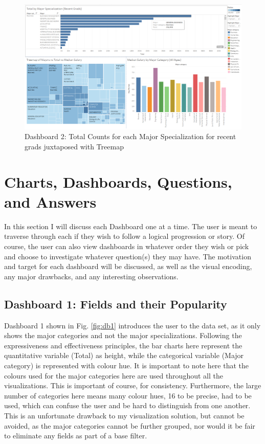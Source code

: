 \documentclass[sigchi]{acmart}
\begin{document}
  \begin{figure}[thpb]
  \includegraphics[width=1.0\textwidth]{DB2.png}
     \caption{Dashboard 2: Total Counts for each Major Specialization for recent grads juxtaposed with Treemap}
         \label{fig:db2}
  \end{figure}
  
\section{Charts, Dashboards, Questions, and Answers}

In this section I will discuss each Dashboard one at a time. The user is meant to traverse through each if they wish to follow a logical progression or story. Of course, the user can also view dashboards in whatever order they wish or pick and choose to investigate whatever question(s) they may have. The motivation and target for each dashboard will be discussed, as well as the visual encoding, any major drawbacks, and any interesting observations.

\subsection{Dashboard 1: Fields and their Popularity}
\label{sec:db1}

Dashboard 1 shown in Fig. \ref{fig:db1} introduces the user to the data set, as it only shows the major categories and not the major specializations. Following the expressiveness and effectiveness principles, the bar charts here represent the quantitative variable (Total) as height, while the categorical variable (Major category) is represented with colour hue. It is important to note here that the colours used for the major categories here are used throughout all the visualizations. This is important of course, for consistency. Furthermore, the large number of categories here means many colour hues, 16 to be precise, had to be used, which can confuse the user and be hard to distinguish from one another. This is an unfortunate drawback to my visualization solution, but cannot be avoided, as the major categories cannot be further grouped, nor would it be fair to eliminate any fields as part of a base filter. 
\end{document}
